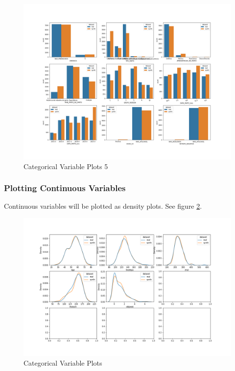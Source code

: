 \documentclass{article}
\begin{document}
\begin{figure}[H]
\centering
\includegraphics[width=\textwidth]{images/categorical_plot_4.png}
\caption{Categorical Variable Plots 5}
\label{fig:categorical4}
\end{figure}

\subsubsection{Plotting Continuous Variables}
Continuous variables will be plotted as density plots. See figure \ref{fig:continuous}.
\begin{figure}[h!]
\centering
\includegraphics[width=\textwidth]{images/continuous_plot_0.png}
\caption{Categorical Variable Plots}
\label{fig:continuous}
\end{figure}
\end{document}
